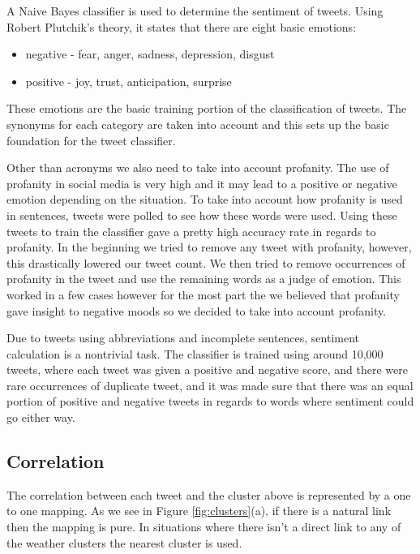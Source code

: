 A Naive Bayes classifier is used to determine the sentiment of tweets.
Using Robert Plutchik's theory, it states that there are eight basic emotions:
\begin{itemize}
\item negative - fear, anger, sadness, depression, disgust
\item positive - joy, trust, anticipation, surprise
\end{itemize}

These emotions are the basic training portion of the classification of tweets. The synonyms for each category are taken into account and this sets up the basic foundation for the tweet classifier.

Other than acronyms we also need to take into account profanity. The use of profanity in social media is very high and it may lead to a positive or negative emotion depending on the situation. To take into account how profanity is used in sentences, tweets were polled to see how these words were used. Using these tweets to train the classifier gave a pretty high accuracy rate in regards to profanity. In the beginning we tried to remove any tweet with profanity, however, this drastically lowered our tweet count. We then tried to remove occurrences of profanity in the tweet and use the remaining words as a judge of emotion. This worked in a few cases however for the most part the we believed that profanity gave insight to negative moods so we decided to take into account profanity.

Due to tweets using abbreviations and incomplete sentences, sentiment calculation is a nontrivial task. The classifier is trained using around 10,000 tweets, where each tweet was given a positive and negative score, and there were rare occurrences of duplicate tweet, and it was made sure that there was an equal portion of positive and negative tweets in regards to words where sentiment could go either way.


\subsection{Correlation}
\label{sec:corr}

The correlation between each tweet and the cluster above is represented by a one to one mapping. As we see in Figure \ref{fig:clusters}(a), if there is a natural link then the mapping is pure. In situations where there isn't a direct link to any of the weather clusters the nearest cluster is used.

